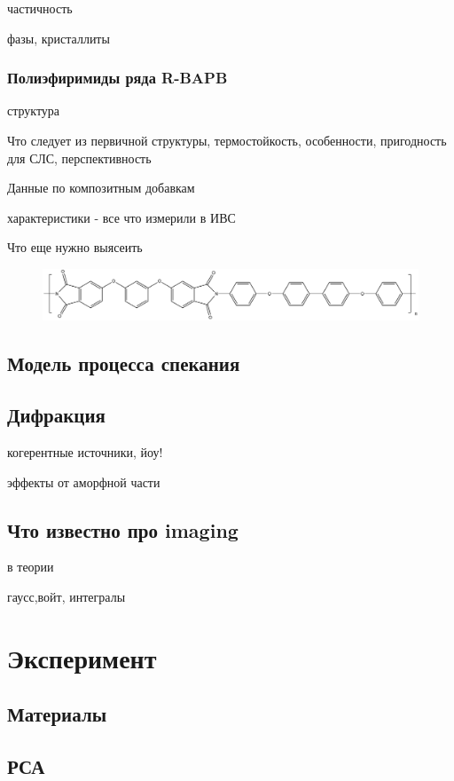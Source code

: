 \documentclass[oneside,final,14pt]{extreport}
\begin{document}
	частичность
	
	фазы, кристаллиты
	
\subsection{Полиэфиримиды ряда R-BAPB }
структура

Что следует из первичной структуры, термостойкость, особенности, пригодность для СЛС, перспективность

Данные по композитным добавкам

характеристики - все что измерили в ИВС

Что еще нужно выясеить

		
	\begin{figure}
	\includegraphics[width=\textwidth]{formula.png}
	\end{figure}
	
	\section{Модель процесса спекания}
	
	\section{Дифракция}
	когерентные источники, йоу!
	
	эффекты от аморфной части
	
	
    \section{Что известно про imaging}
    в теории
    
    гаусс,войт, интегралы
	
	\chapter{Эксперимент}

	\section{Материалы}
	
	
	
	\section{РСА}
	
\end{document}

